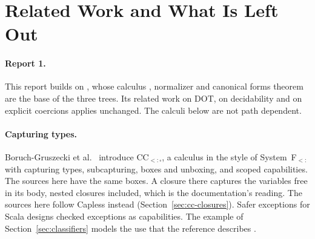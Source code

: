 \section{Related Work and What Is Left Out}\label{sec:related}
\mathplain

\paragraph{Report 1.}
This report builds on \Rone, whose calculus \FCdot, normalizer and canonical forms theorem are the base of the three trees. Its related work on DOT, on decidability and on explicit coercions applies unchanged. The calculi below are not path dependent.

\paragraph{Capturing types.}
Boruch-Gruszecki et al.\ \cite{boruchgruszecki2023capturing} introduce $\mathrm{CC}_{<:\square}$, a calculus in the style of System~F$_{<:}$ with capturing types, subcapturing, boxes and unboxing, and scoped capabilities. The sources here have the same boxes. A closure there captures the variables free in its body, nested closures included, which is the documentation's reading. The sources here follow Capless instead (Section~\ref{sec:cc-closures}). Safer exceptions for Scala \cite{odersky2021safer} designs checked exceptions as capabilities. The  example of Section~\ref{sec:classifiers} models the use that the reference describes \cite{scala3cc}.

